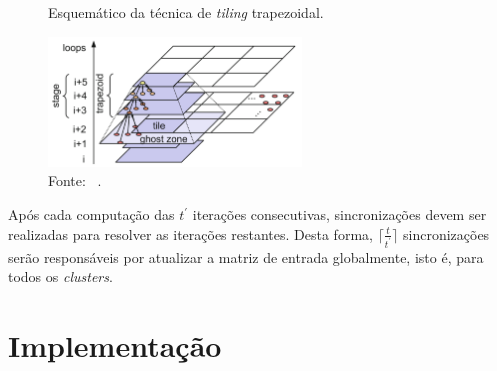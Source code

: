 
\begin{figure}[!h]
	\centering
    \caption{Esquemático da técnica de \textit{tiling} trapezoidal.}
    \includegraphics[width=0.6\textwidth]{figs/tiling.pdf}
    \caption*{Fonte: ~\cite{meng11}.}
    \label{fig:tiling}
\end{figure}


%

Após cada computação das $t^\prime$ iterações consecutivas,
sincronizações devem ser realizadas para resolver as iterações restantes. Desta
forma, $\lceil\frac{t}{t^\prime}\rceil$ sincronizações serão responsáveis por
atualizar a matriz de entrada globalmente, isto é, para todos os
\textit{clusters}.

\section{Implementação}



